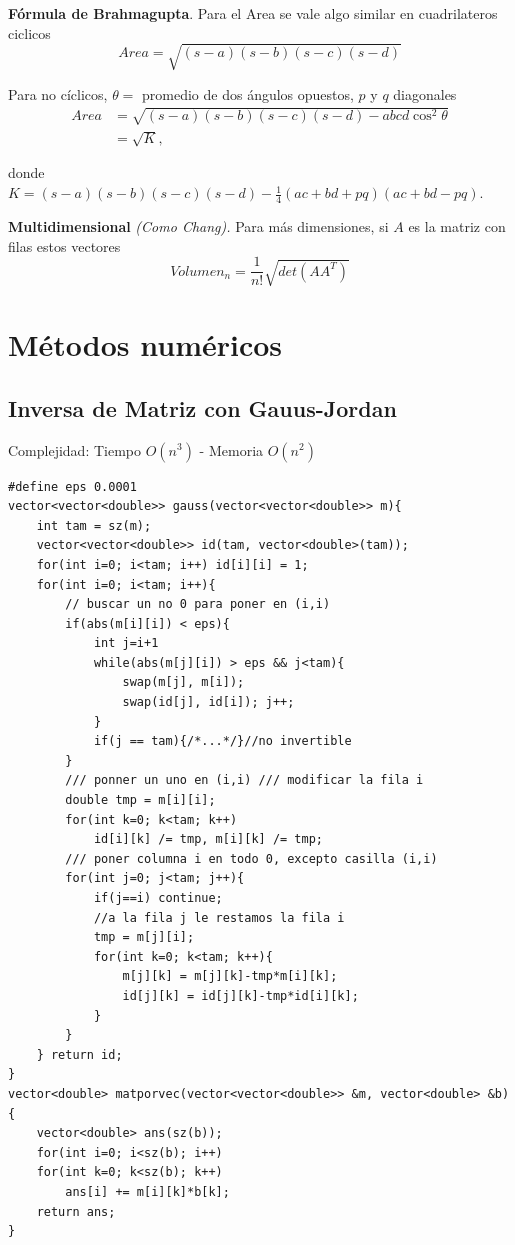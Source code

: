 \documentclass[10pt,spanish,mexico]{article}
\newcommand{\Pa}[1]{\left( #1 \right)}
\numberwithin{equation}{section}
\begin{document}
\begin{multicols}{2}
\textbf{Fórmula de Brahmagupta}. Para el Area se vale algo similar en cuadrilateros ciclicos
\begin{equation*}
    Area = \sqrt{(s-a)(s-b)(s-c)(s-d)}
\end{equation*}

Para no cíclicos, $\theta=$ promedio de dos ángulos opuestos, $p$ y $q$ diagonales
\begin{align*}
    Area &= \sqrt{(s-a)(s-b)(s-c)(s-d)-abcd \cos^2\theta}\\
    &=\sqrt{K},
\end{align*}

donde $K = (s-a)(s-b)(s-c)(s-d) - \frac{1}{4}(ac+bd+pq)(ac+bd-pq)$.

\textbf{Multidimensional} \textit{(Como Chang).} Para más dimensiones, si $A$ es la matriz con filas estos vectores
\begin{equation*}
    Volumen_n = \frac{1}{n!} \sqrt{det\Pa{AA^T}}
\end{equation*}


\hrulefill
\section{Métodos numéricos}
\subsection{Inversa de Matriz con Gauus-Jordan}
Complejidad: Tiempo $O\left(n^3\right)$ - Memoria $O\left(n^2\right)$
\begin{verbatim}
#define eps 0.0001
vector<vector<double>> gauss(vector<vector<double>> m){
    int tam = sz(m);
    vector<vector<double>> id(tam, vector<double>(tam));
    for(int i=0; i<tam; i++) id[i][i] = 1;
    for(int i=0; i<tam; i++){
        // buscar un no 0 para poner en (i,i)
        if(abs(m[i][i]) < eps){
            int j=i+1
            while(abs(m[j][i]) > eps && j<tam){
                swap(m[j], m[i]);
                swap(id[j], id[i]); j++;
            }
            if(j == tam){/*...*/}//no invertible
        }
        /// ponner un uno en (i,i) /// modificar la fila i
        double tmp = m[i][i];
        for(int k=0; k<tam; k++)
            id[i][k] /= tmp, m[i][k] /= tmp;
        /// poner columna i en todo 0, excepto casilla (i,i)
        for(int j=0; j<tam; j++){
            if(j==i) continue;
            //a la fila j le restamos la fila i
            tmp = m[j][i];
            for(int k=0; k<tam; k++){
                m[j][k] = m[j][k]-tmp*m[i][k];
                id[j][k] = id[j][k]-tmp*id[i][k];
            }
        }
    } return id;
}
vector<double> matporvec(vector<vector<double>> &m, vector<double> &b){
    vector<double> ans(sz(b));
    for(int i=0; i<sz(b); i++)
    for(int k=0; k<sz(b); k++)
        ans[i] += m[i][k]*b[k];
    return ans;
}
\end{verbatim}


\end{multicols}
\end{document}
